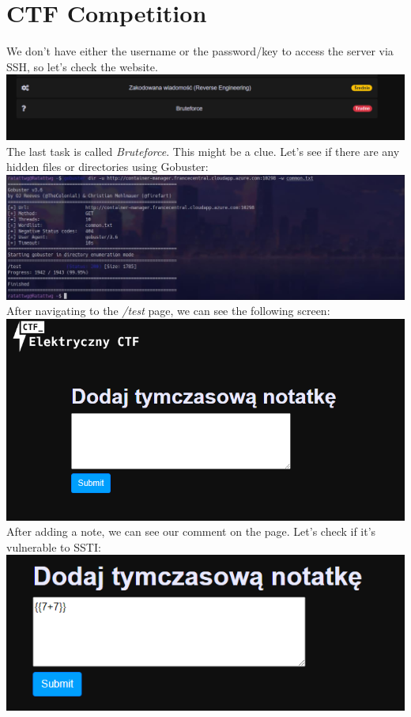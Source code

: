 \documentclass{article}
\begin{document}
\section{CTF Competition}
We don’t have either the username or the password/key to access the server via SSH, so let’s check the website.
\vspace{3mm} \\
\includegraphics[width=\textwidth]{"image80.png"}
The last task is called \textit{Bruteforce}. This might be a clue. Let’s see if there are any hidden files or directories using Gobuster:
\vspace{3mm} \\
\includegraphics[width=\textwidth]{"image81.jpeg"}
After navigating to the \textit{/test} page, we can see the following screen:
\vspace{3mm} \\
\includegraphics[width=\textwidth]{"image82.png"}
\newpage
After adding a note, we can see our comment on the page. Let’s check if it’s vulnerable to SSTI:
\vspace{3mm} \\
\includegraphics[width=\textwidth]{"image83.png"}
\end{document}
